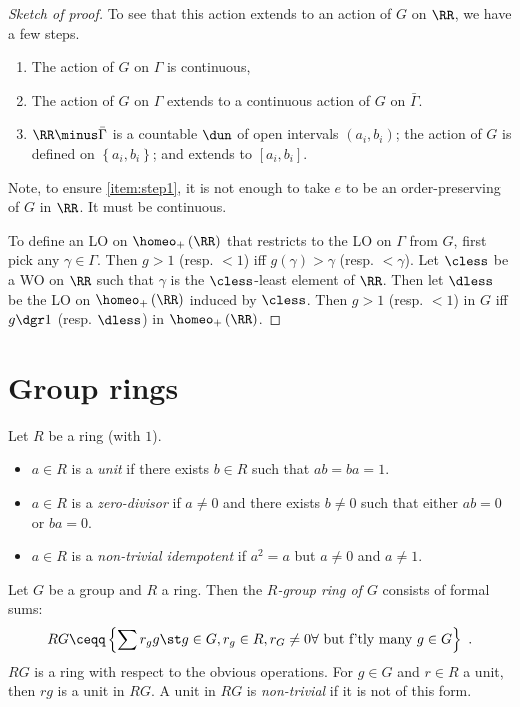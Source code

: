 \begin{proof}[Sketch of proof]
To see that
this action extends to an action of $G$ on $\RR$, we have a few steps.
\begin{enumerate}[label=Step \numbers:]
\item The action of $G$ on $\Gamma$ is continuous,
\label{item:step1}
\item The action of $G$ on $\Gamma$ extends to a continuous action of $G$ on $\bar
\Gamma$.
\item $\RR\minus \bar \Gamma$ is a countable $\dun$ of open intervals $\left(a_i ,
b_i\right)$;
the action of $G$ is defined on $\left\{a_i , b_i\right\}$; and extends to
$\left[a_i , b_i\right]$.
\end{enumerate}

Note, to ensure \ref{item:step1}, it is not enough to take $e$ to be an order-preserving
of $G$ in $\RR$. It must be continuous.

To define an LO on $\homeo_+\left(\RR\right)$ that restricts to the LO on $\Gamma$ from
$G$, first pick any $\gamma \in \Gamma$.
Then $g > 1$ (resp. $<1$) iff $g\left(\gamma\right) > \gamma$ (resp. $< \gamma$).
Let $\cless$ be a WO on $\RR$ such that $\gamma$ is the $\cless$-least element of $\RR$.
Then let $\dless$ be the LO on $\homeo_+\left(\RR\right)$ induced by $\cless$. Then
$g > 1$ (resp. $<1$) in $G$ iff $g\dgr 1$ (resp. $\dless$) in $\homeo_+\left(\RR\right)$.
\end{proof}

\section{Group rings}

Let $R$ be a ring (with $1$). 
\begin{itemize}
\item $a\in R$ is a \emph{unit} if there exists $b\in R$ such that $ab = ba = 1$.
\item $a\in R$ is a \emph{zero-divisor} if $a\neq 0$ and there exists $b\neq 0$ such that either
$ab = 0$ or $ba = 0$.
\item $a\in R$ is a \emph{non-trivial idempotent} if $a^2 = a$ but $a\neq 0$ and $a\neq 1$.
\end{itemize}
Let $G$ be a group and $R$ a ring. Then the \emph{$R$-group ring of $G$} consists of
formal sums:
\begin{equation}
RG \ceqq \left\{\sum r_g g \st g\in G , r_g\in R, r_G\neq 0\forall \text{ but f'tly many }
g\in G\right\}
\ .
\end{equation}
$RG$ is a ring with respect to the obvious operations. For $g\in G$ and $r\in R$ a unit,
then $rg$ is a unit in $RG$.
A unit in $RG$ is \emph{non-trivial} if it is not of this form.

